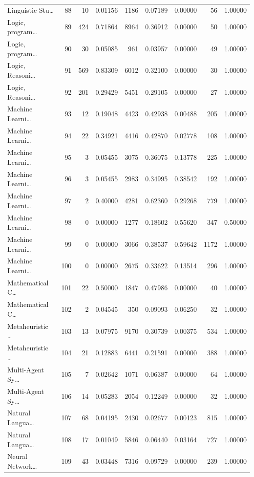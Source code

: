 \begin{table}
\begin{tabular}{lrrrrrrrr}
Linguistic Stu… & 88 & 10 & 0.01156 & 1186 & 0.07189 & 0.00000 & 56 & 1.00000 \\
Logic, program… & 89 & 424 & 0.71864 & 8964 & 0.36912 & 0.00000 & 50 & 1.00000 \\
Logic, program… & 90 & 30 & 0.05085 & 961 & 0.03957 & 0.00000 & 49 & 1.00000 \\
Logic, Reasoni… & 91 & 569 & 0.83309 & 6012 & 0.32100 & 0.00000 & 30 & 1.00000 \\
Logic, Reasoni… & 92 & 201 & 0.29429 & 5451 & 0.29105 & 0.00000 & 27 & 1.00000 \\
Machine Learni… & 93 & 12 & 0.19048 & 4423 & 0.42938 & 0.00488 & 205 & 1.00000 \\
Machine Learni… & 94 & 22 & 0.34921 & 4416 & 0.42870 & 0.02778 & 108 & 1.00000 \\
Machine Learni… & 95 & 3 & 0.05455 & 3075 & 0.36075 & 0.13778 & 225 & 1.00000 \\
Machine Learni… & 96 & 3 & 0.05455 & 2983 & 0.34995 & 0.38542 & 192 & 1.00000 \\
Machine Learni… & 97 & 2 & 0.40000 & 4281 & 0.62360 & 0.29268 & 779 & 1.00000 \\
Machine Learni… & 98 & 0 & 0.00000 & 1277 & 0.18602 & 0.55620 & 347 & 0.50000 \\
Machine Learni… & 99 & 0 & 0.00000 & 3066 & 0.38537 & 0.59642 & 1172 & 1.00000 \\
Machine Learni… & 100 & 0 & 0.00000 & 2675 & 0.33622 & 0.13514 & 296 & 1.00000 \\
Mathematical C… & 101 & 22 & 0.50000 & 1847 & 0.47986 & 0.00000 & 40 & 1.00000 \\
Mathematical C… & 102 & 2 & 0.04545 & 350 & 0.09093 & 0.06250 & 32 & 1.00000 \\
Metaheuristic … & 103 & 13 & 0.07975 & 9170 & 0.30739 & 0.00375 & 534 & 1.00000 \\
Metaheuristic … & 104 & 21 & 0.12883 & 6441 & 0.21591 & 0.00000 & 388 & 1.00000 \\
Multi-Agent Sy… & 105 & 7 & 0.02642 & 1071 & 0.06387 & 0.00000 & 64 & 1.00000 \\
Multi-Agent Sy… & 106 & 14 & 0.05283 & 2054 & 0.12249 & 0.00000 & 32 & 1.00000 \\
Natural Langua… & 107 & 68 & 0.04195 & 2430 & 0.02677 & 0.00123 & 815 & 1.00000 \\
Natural Langua… & 108 & 17 & 0.01049 & 5846 & 0.06440 & 0.03164 & 727 & 1.00000 \\
Neural Network… & 109 & 43 & 0.03448 & 7316 & 0.09729 & 0.00000 & 239 & 1.00000 \\

\end{tabular}
\end{table}
